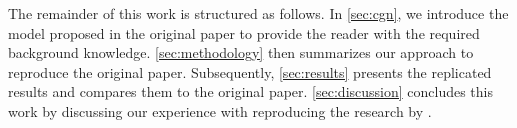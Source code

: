 The remainder of this work is structured as follows. In \cref{sec:cgn}, we introduce the model proposed in the original paper to provide the reader with the required background knowledge. \cref{sec:methodology} then summarizes our approach to reproduce the original paper. Subsequently, \cref{sec:results} presents the replicated results and compares them to the original paper. \cref{sec:discussion} concludes this work by discussing our experience with reproducing the research by .



